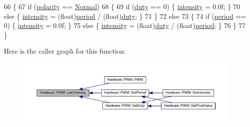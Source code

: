 \begin{DoxyCode}
66     \{
67         \textcolor{keywordflow}{if} (\hyperlink{class_hardware_1_1_p_w_m_ad346586d086f8462c3de6a4c19edb1d3}{polarity} == \hyperlink{class_hardware_1_1_p_w_m_a728111433109229b4da1efc953a107c1a90676a804c624195f2b488a0a8fdc82e}{Normal})
68         \{
69             \textcolor{keywordflow}{if} (\hyperlink{class_hardware_1_1_p_w_m_a3309b2645c4c817384d91f33f0df5d64}{duty} == 0) \{ \hyperlink{class_hardware_1_1_p_w_m_afcfc81ddeeb9c510ad4d00b215477d7a}{intensity} = 0.0f; \}
70             \textcolor{keywordflow}{else} \{ \hyperlink{class_hardware_1_1_p_w_m_afcfc81ddeeb9c510ad4d00b215477d7a}{intensity} = (float)\hyperlink{class_hardware_1_1_p_w_m_a91323a511e37d396f46d08f4159ef761}{period} / (\textcolor{keywordtype}{float})\hyperlink{class_hardware_1_1_p_w_m_a3309b2645c4c817384d91f33f0df5d64}{duty}; \}
71         \}
72         \textcolor{keywordflow}{else}
73         \{
74             \textcolor{keywordflow}{if} (\hyperlink{class_hardware_1_1_p_w_m_a91323a511e37d396f46d08f4159ef761}{period} == 0) \{ \hyperlink{class_hardware_1_1_p_w_m_afcfc81ddeeb9c510ad4d00b215477d7a}{intensity} = 0.0f; \}
75             \textcolor{keywordflow}{else} \{ \hyperlink{class_hardware_1_1_p_w_m_afcfc81ddeeb9c510ad4d00b215477d7a}{intensity} = (float)\hyperlink{class_hardware_1_1_p_w_m_a3309b2645c4c817384d91f33f0df5d64}{duty} / (\textcolor{keywordtype}{float})\hyperlink{class_hardware_1_1_p_w_m_a91323a511e37d396f46d08f4159ef761}{period}; \}
76         \}
77     \}
\end{DoxyCode}


Here is the caller graph for this function\+:\nopagebreak
\begin{figure}[H]
\begin{center}
\leavevmode
\includegraphics[width=350pt]{class_hardware_1_1_p_w_m_a891abdbbd00aae4f0a4afdf0a9e3a160_icgraph}
\end{center}
\end{figure}


\hypertarget{class_hardware_1_1_p_w_m_ad826f2fc67d34bc3c6d5fc859c32c1cc}{}
